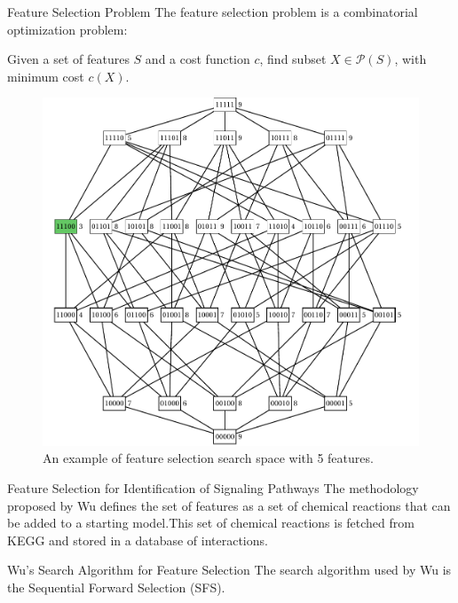 \documentclass{beamer}
\newcommand{\powerset}{\mathcal{P}}
\begin{document}
\begin{frame}{Feature Selection Problem}
The feature selection problem is a combinatorial optimization problem:
\begin{center}
Given a set of features $S$ and a cost function $c$, find subset 
        $X \in \powerset (S)$, with minimum cost $c(X)$.
\end{center}

\pause
\begin{figure}
    \includegraphics[scale=.24]{introduction/Boolean_lattice.pdf}
    \caption{An example of feature selection search space with 5 
    features.}
\end{figure}
\end{frame}


\begin{frame}{Feature Selection for Identification of Signaling 
Pathways}
The methodology proposed by Wu defines the set of features as a set of 
chemical reactions that can be added to a starting model.\pause This set 
of chemical reactions is fetched from KEGG and stored in a database of
interactions.
\end{frame}


\begin{frame}{Wu's Search Algorithm for Feature Selection}
The search algorithm used by Wu is the Sequential Forward Selection 
(SFS).
\end{frame}
\end{document}
